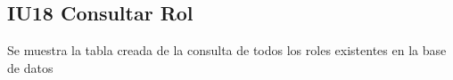 \newpage
\subsection{IU18 Consultar Rol}
		Se muestra la tabla creada de la consulta de todos los roles existentes en la base de datos
